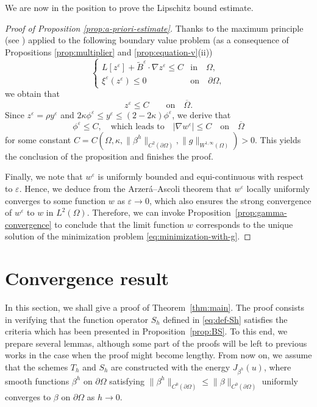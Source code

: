 \documentclass[11pt]{article}
\numberwithin{equation}{section}
\newcommand{\pOmega}[0]{\partial\Omega}
\def\leq{\leqslant}
\begin{document}
We are now in the position to prove the Lipschitz bound estimate.
\begin{proof}[Proof of Proposition \ref{prop:a-priori-estimate}]

Thanks to the maximum principle (see \cite{PW84}) applied to the following boundary value problem (as a consequence of Propositions \ref{prop:multiplier} and \ref{prop:equation-v}(ii))
\begin{equation*}
\begin{cases} 
\displaystyle L[z^{\varepsilon}] + \widetilde{B}^{\varepsilon}\cdot\nabla z^{\varepsilon}\leq C & \text{in} \quad \Omega, \\ 
\xi^{\varepsilon}(z^{\varepsilon}) \leq0 & \text{on} \quad \partial\Omega,
\end{cases}
\end{equation*}
we obtain that $$z^{\varepsilon}\leq C\qquad\text{on}\quad\overline{\Omega}.$$
Since $z^{\varepsilon} = \rho y^{\varepsilon}$ and $2\kappa\phi^{\varepsilon} \leq y^{\varepsilon} \leq (2-2\kappa)\phi^{\varepsilon}$, we derive that $$\phi^{\varepsilon}\leq C,\quad\text{which leads to}\quad |\nabla w^{\varepsilon}|\leq C\quad\text{on}\quad\overline{\Omega}$$
for some constant $C=C(\Omega,\kappa,\|\beta^h\|_{C^2(\partial\Omega)},\|g\|_{W^{1,\infty}(\Omega)})>0$. This yields the conclusion of the proposition and finishes the proof.

Finally, we note that $w^\varepsilon$ is uniformly bounded and equi-continuous with respect to $\varepsilon$.
Hence, we deduce from the Arzer\'a--Ascoli theorem that $w^\varepsilon$ locally uniformly converges to some function $w$ as $\varepsilon\to 0$, which also ensures the strong convergence of $w^\varepsilon$ to $w$ in $L^2(\Omega)$.
Therefore, we can invoke Proposition~\ref{prop:gamma-convergence} to conclude that the limit function $w$ corresponds to the unique solution of the minimization problem \eqref{eq:minimization-with-g}. 
\end{proof}

\section{Convergence result}
\label{sec:convergence}
In this section, we shall give a proof of Theorem~\ref{thm:main}.
The proof consists in verifying that the function operator $S_h$ defined in \eqref{eq:def-Sh} satisfies the criteria which has been presented in Proposition~\ref{prop:BS}.
To this end, we prepare several lemmas, although some part of the proofs will be left to previous works \cite{EG24,EG25} in the case when the proof might become lengthy.
From now on, we assume that the schemes $T_h$ and $S_h$ are constructed with the energy $J_{\beta^h}(u)$, where smooth functions $\beta^h$ on $\partial\Omega$ satisfying $\|\beta^h\|_{C^0(\partial\Omega)} \leq \|\beta\|_{C^0(\partial\Omega)}$ uniformly converges to $\beta$ on $\pOmega$ as $h\to 0$.
\end{document}
